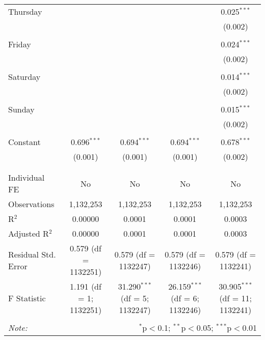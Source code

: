 \documentclass[
]{article}
\begin{document}
\begin{table}[!htbp]
{\begin{tabular}{@{\extracolsep{5pt}}lcccc}
 Thursday &  &  &  & 0.025$^{***}$ \\ 
  &  &  &  & (0.002) \\ 
  & & & & \\ 
 Friday &  &  &  & 0.024$^{***}$ \\ 
  &  &  &  & (0.002) \\ 
  & & & & \\ 
 Saturday &  &  &  & 0.014$^{***}$ \\ 
  &  &  &  & (0.002) \\ 
  & & & & \\ 
 Sunday &  &  &  & 0.015$^{***}$ \\ 
  &  &  &  & (0.002) \\ 
  & & & & \\ 
 Constant & 0.696$^{***}$ & 0.694$^{***}$ & 0.694$^{***}$ & 0.678$^{***}$ \\ 
  & (0.001) & (0.001) & (0.001) & (0.002) \\ 
  & & & & \\ 
\hline \\[-1.8ex] 
Individual FE & No & No & No & No \\ 
Observations & 1,132,253 & 1,132,253 & 1,132,253 & 1,132,253 \\ 
R$^{2}$ & 0.00000 & 0.0001 & 0.0001 & 0.0003 \\ 
Adjusted R$^{2}$ & 0.00000 & 0.0001 & 0.0001 & 0.0003 \\ 
Residual Std. Error & 0.579 (df = 1132251) & 0.579 (df = 1132247) & 0.579 (df = 1132246) & 0.579 (df = 1132241) \\ 
F Statistic & 1.191 (df = 1; 1132251) & 31.290$^{***}$ (df = 5; 1132247) & 26.159$^{***}$ (df = 6; 1132246) & 30.905$^{***}$ (df = 11; 1132241) \\ 
\hline 
\hline \\[-1.8ex] 
\textit{Note:}  & \multicolumn{4}{r}{$^{*}$p$<$0.1; $^{**}$p$<$0.05; $^{***}$p$<$0.01} \\ 
\end{tabular}
} 
\end{table} 
\newpage
\end{document}
